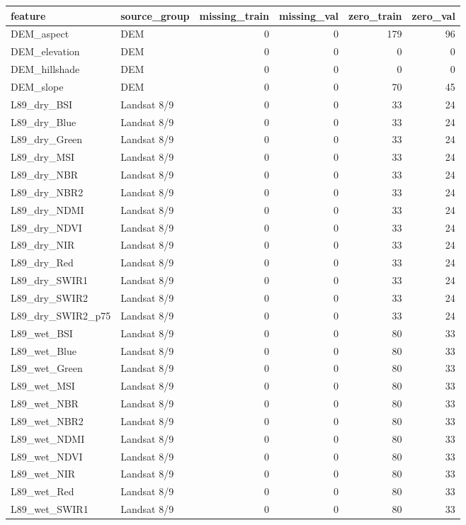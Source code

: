 \begin{tabular}{llrrrr}
\toprule
feature & source_group & missing_train & missing_val & zero_train & zero_val \\
\midrule
DEM_aspect & DEM & 0 & 0 & 179 & 96 \\
DEM_elevation & DEM & 0 & 0 & 0 & 0 \\
DEM_hillshade & DEM & 0 & 0 & 0 & 0 \\
DEM_slope & DEM & 0 & 0 & 70 & 45 \\
L89_dry_BSI & Landsat 8/9 & 0 & 0 & 33 & 24 \\
L89_dry_Blue & Landsat 8/9 & 0 & 0 & 33 & 24 \\
L89_dry_Green & Landsat 8/9 & 0 & 0 & 33 & 24 \\
L89_dry_MSI & Landsat 8/9 & 0 & 0 & 33 & 24 \\
L89_dry_NBR & Landsat 8/9 & 0 & 0 & 33 & 24 \\
L89_dry_NBR2 & Landsat 8/9 & 0 & 0 & 33 & 24 \\
L89_dry_NDMI & Landsat 8/9 & 0 & 0 & 33 & 24 \\
L89_dry_NDVI & Landsat 8/9 & 0 & 0 & 33 & 24 \\
L89_dry_NIR & Landsat 8/9 & 0 & 0 & 33 & 24 \\
L89_dry_Red & Landsat 8/9 & 0 & 0 & 33 & 24 \\
L89_dry_SWIR1 & Landsat 8/9 & 0 & 0 & 33 & 24 \\
L89_dry_SWIR2 & Landsat 8/9 & 0 & 0 & 33 & 24 \\
L89_dry_SWIR2_p75 & Landsat 8/9 & 0 & 0 & 33 & 24 \\
L89_wet_BSI & Landsat 8/9 & 0 & 0 & 80 & 33 \\
L89_wet_Blue & Landsat 8/9 & 0 & 0 & 80 & 33 \\
L89_wet_Green & Landsat 8/9 & 0 & 0 & 80 & 33 \\
L89_wet_MSI & Landsat 8/9 & 0 & 0 & 80 & 33 \\
L89_wet_NBR & Landsat 8/9 & 0 & 0 & 80 & 33 \\
L89_wet_NBR2 & Landsat 8/9 & 0 & 0 & 80 & 33 \\
L89_wet_NDMI & Landsat 8/9 & 0 & 0 & 80 & 33 \\
L89_wet_NDVI & Landsat 8/9 & 0 & 0 & 80 & 33 \\
L89_wet_NIR & Landsat 8/9 & 0 & 0 & 80 & 33 \\
L89_wet_Red & Landsat 8/9 & 0 & 0 & 80 & 33 \\
L89_wet_SWIR1 & Landsat 8/9 & 0 & 0 & 80 & 33 \\

\end{tabular}
